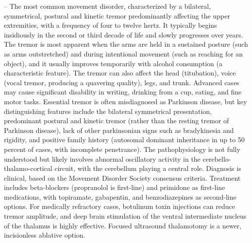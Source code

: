 -- The most common movement disorder, characterized by a bilateral, symmetrical, postural and kinetic tremor predominantly affecting the upper extremities, with a frequency of four to twelve hertz. It typically begins insidiously in the second or third decade of life and slowly progresses over years. The tremor is most apparent when the arms are held in a sustained posture (such as arms outstretched) and during intentional movement (such as reaching for an object), and it usually improves temporarily with alcohol consumption (a characteristic feature). The tremor can also affect the head (titubation), voice (vocal tremor, producing a quavering quality), legs, and trunk. Advanced cases may cause significant disability in writing, drinking from a cup, eating, and fine motor tasks. Essential tremor is often misdiagnosed as Parkinson disease, but key distinguishing features include the bilateral symmetrical presentation, predominant postural and kinetic tremor (rather than the resting tremor of Parkinson disease), lack of other parkinsonian signs such as bradykinesia and rigidity, and positive family history (autosomal dominant inheritance in up to 50 percent of cases, with incomplete penetrance). The pathophysiology is not fully understood but likely involves abnormal oscillatory activity in the cerebello-thalamo-cortical circuit, with the cerebellum playing a central role. Diagnosis is clinical, based on the Movement Disorder Society consensus criteria. Treatment includes beta-blockers (propranolol is first-line) and primidone as first-line medications, with topiramate, gabapentin, and benzodiazepines as second-line options. For medically refractory cases, botulinum toxin injections can reduce tremor amplitude, and deep brain stimulation of the ventral intermediate nucleus of the thalamus is highly effective. Focused ultrasound thalamotomy is a newer, incisionless ablative option.

